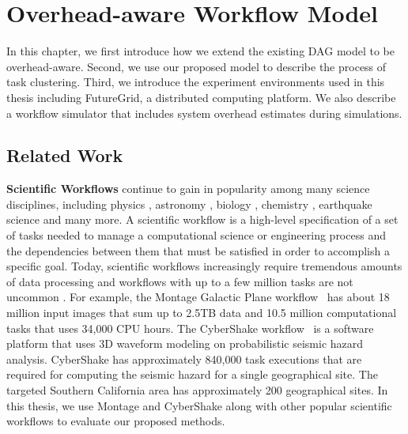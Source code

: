 \chapter{Overhead-aware Workflow Model}
\label{chap:model}

In this chapter, we first introduce how we extend the existing DAG model to be overhead-aware. Second, we use our proposed model to describe the process of task clustering. 
Third, we introduce the experiment environments used in this thesis including FutureGrid, a distributed computing platform. We also describe a workflow simulator that includes system overhead estimates during simulations. 


\section{Related Work}
\label{sect:workflow_model}

\textbf{Scientific Workflows} continue to gain in popularity among many science disciplines, including physics \cite{Deelman2002}, astronomy \cite{Sakellariou2010}, biology \cite{Lathers2006, Oinn2004}, chemistry \cite{Wieczorek2005}, earthquake science \cite{Maechling2007} and many more. A scientific workflow is a high-level specification of a set of tasks needed to manage a computational science or engineering process and the dependencies between them that must be satisfied in order to accomplish a specific goal. Today, scientific workflows increasingly require tremendous amounts of data processing and workflows with up to a few million tasks are not uncommon \cite{Callaghan2011}. For example, the Montage Galactic Plane workflow~\cite{Berriman2004} has about 18 million input images that sum up to 2.5TB data and 10.5 million computational tasks that uses 34,000 CPU hours. The CyberShake workflow~\cite{Callaghan2008} is a software platform that uses 3D waveform modeling on probabilistic seismic hazard analysis. CyberShake has approximately 840,000 task executions that are required for computing the seismic hazard for a single geographical site. The targeted Southern California area has approximately 200 geographical sites. In this thesis, we use Montage and CyberShake along with other popular scientific workflows to evaluate our proposed methods. 

